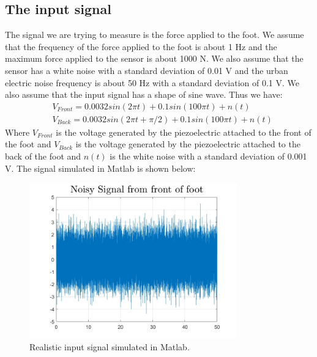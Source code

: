\subsection{The input signal}
The signal we are trying to measure is the force applied to the foot. We assume that the frequency of the force applied to the foot is about 1 Hz and the maximum force applied to the sensor is about 1000 N. We also assume that the sensor has a white noise with a standard deviation of 0.01 V and the urban electric noise frequency is about 50 Hz with a standard deviation of 0.1 V. We also assume that the input signal has a shape of sine wave. Thus we have:
\begin{align}
     & V_{Front} = 0.0032  sin(2\pi t) + 0.1 sin(100 \pi t) + n(t)        \\
     & V_{Back} = 0.0032  sin(2\pi t + \pi/2) + 0.1 sin(100 \pi t) + n(t)
\end{align}
Where $V_{Front}$ is the voltage generated by the piezoelectric attached to the front of the foot and $V_{Back}$ is the voltage generated by the piezoelectric attached to the back of the foot and $n(t)$ is the white noise with a standard deviation of 0.001 V.
The signal simulated in Matlab is shown below:
\begin{figure}[H]
    \centering
    \includegraphics[width=0.8\textwidth]{../Report/Figures/2.CircuitDesign/InputSignal_WithNoise.jpg}
    \caption{Realistic input signal simulated in Matlab.}
\end{figure}

